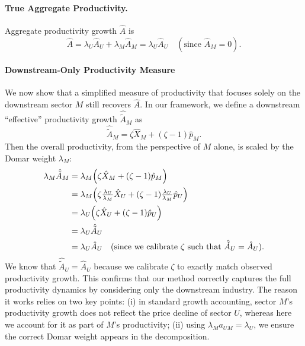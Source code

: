 \documentclass[11pt]{article}
\begin{document}
\paragraph{True Aggregate Productivity.}
Aggregate productivity growth $\hat{A}$ is 
\begin{equation}
      \hat{A} 
     =  
    \lambda_U  \hat{A}_U  +  \lambda_M  \hat{A}_M
     =  \lambda_U  \hat{A}_U
    \quad (\text{since }\hat{A}_M=0).
\end{equation}


\paragraph{Downstream-Only Productivity Measure} We now show that a simplified measure of productivity that focuses solely on the downstream sector $M$ still recovers $\hat{A}$. In our framework, we define a downstream ``effective'' productivity growth $\hat{\tilde{A}}_M$ as
\begin{equation*}
    \hat{\tilde{A}}_M =  \zeta \hat{X}_M + (\zeta - 1) \hat{p}_M.
\end{equation*}
Then the overall productivity, from the perspective of $M$ alone, is scaled by the Domar weight $\lambda_M$:
\begin{equation}
    \begin{aligned}
    \lambda_M  \hat{\tilde{A}}_M 
    &= \lambda_M\Bigl(\zeta \hat{X}_M + (\zeta-1) \hat{p}_M\Bigr)\\
    &= \lambda_M\Bigl(\zeta \tfrac{\lambda_U}{\lambda_M} \hat{X}_U 
        +  (\zeta-1) \tfrac{\lambda_U}{\lambda_M} \hat{p}_U\Bigr)\\
    &= \lambda_U\Bigl(\zeta \hat{X}_U + (\zeta-1) \hat{p}_U\Bigr)\\
    &= \lambda_U \hat{\tilde{A}}_U\\
    &=\lambda_U \hat{A}_U\quad(\text{since we calibrate }\zeta\text{ such that }\hat{\tilde{A}}_U=\hat{A}_U).
\end{aligned}
\end{equation}
We know that $\hat{\tilde{A}}_U = \hat{A}_U$ because we calibrate $\zeta$ to exactly match observed productivity growth.
This confirms that our method correctly captures the full productivity dynamics by considering only the downstream industry. The reason it works relies on two key points: (i) in standard growth accounting, sector $M$'s productivity growth does not reflect the price decline of sector $U$, whereas here we account for it as part of $M$'s productivity; (ii) using $\lambda_M a_{UM} = \lambda_U$, we ensure the correct Domar weight appears in the decomposition. 
\end{document}
